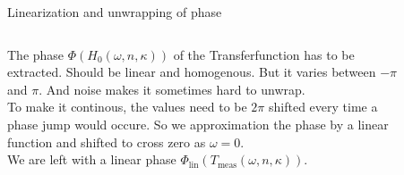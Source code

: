 \documentclass[aspectratio=1610, 9pt]{beamer}
\begin{document}
\begin{frame}{Linearization and unwrapping of phase}
  \begin{columns}
    \begin{column}{0.4\textwidth}
      The phase $\Phi(H_0(\omega, n, \kappa))$ of the Transferfunction has to be extracted.
      Should be linear and homogenous.
      But it varies between $-\pi$ and $\pi$. And noise makes it sometimes hard to unwrap.\\
      To make it continous, the values need to be $2\pi$ shifted every time a phase jump would occure.
      So we approximation the phase by a linear function and shifted to cross zero as $\omega=0$.\\
      We are left with a linear phase $\Phi_\text{lin}(T_\text{meas}(\omega, n, \kappa))$.
    \end{column}
    \begin{column}{0.6\textwidth}
      \begin{figure}
      \end{figure}
    \end{column}
  \end{columns}
\end{frame}
\end{document}
